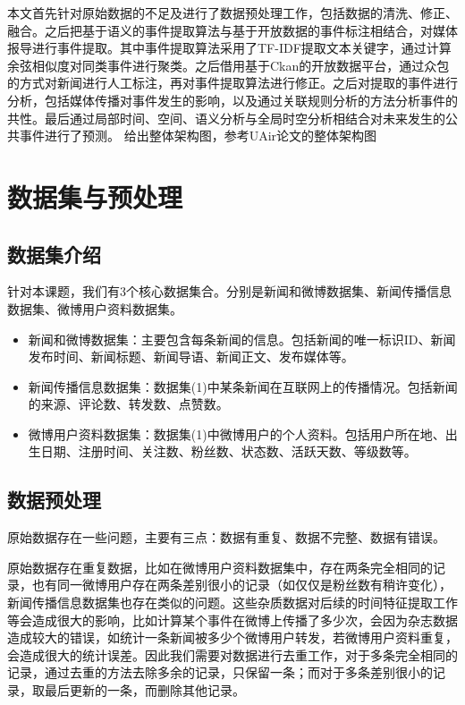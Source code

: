 \documentclass[a4paper,10pt]{article}
\begin{document}
本文首先针对原始数据的不足及进行了数据预处理工作，包括数据的清洗、修正、融合。之后把基于语义的事件提取算法与基于开放数据的事件标注相结合，对媒体报导进行事件提取。其中事件提取算法采用了TF-IDF提取文本关键字，通过计算余弦相似度对同类事件进行聚类。之后借用基于Ckan的开放数据平台，通过众包的方式对新闻进行人工标注，再对事件提取算法进行修正。之后对提取的事件进行分析，包括媒体传播对事件发生的影响，以及通过关联规则分析的方法分析事件的共性。最后通过局部时间、空间、语义分析与全局时空分析相结合对未来发生的公共事件进行了预测。
给出整体架构图，参考UAir论文的整体架构图

\section{数据集与预处理}

\subsection{数据集介绍}

针对本课题，我们有3个核心数据集合。分别是新闻和微博数据集、新闻传播信息数据集、微博用户资料数据集。
\begin{itemize}
\item 新闻和微博数据集：主要包含每条新闻的信息。包括新闻的唯一标识ID、新闻发布时间、新闻标题、新闻导语、新闻正文、发布媒体等。
\item 新闻传播信息数据集：数据集(1)中某条新闻在互联网上的传播情况。包括新闻的来源、评论数、转发数、点赞数。
\item 微博用户资料数据集：数据集(1)中微博用户的个人资料。包括用户所在地、出生日期、注册时间、关注数、粉丝数、状态数、活跃天数、等级数等。
\end{itemize}


\subsection{数据预处理}

原始数据存在一些问题，主要有三点：数据有重复、数据不完整、数据有错误。

原始数据存在重复数据，比如在微博用户资料数据集中，存在两条完全相同的记录，也有同一微博用户存在两条差别很小的记录（如仅仅是粉丝数有稍许变化），新闻传播信息数据集也存在类似的问题。这些杂质数据对后续的时间特征提取工作等会造成很大的影响，比如计算某个事件在微博上传播了多少次，会因为杂志数据造成较大的错误，如统计一条新闻被多少个微博用户转发，若微博用户资料重复，会造成很大的统计误差。因此我们需要对数据进行去重工作，对于多条完全相同的记录，通过去重的方法去除多余的记录，只保留一条；而对于多条差别很小的记录，取最后更新的一条，而删除其他记录。
\end{document}
